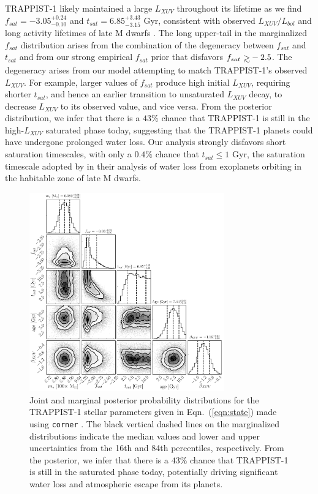 \documentclass[twocolumn]{aastex62}
\def\gsim{~\rlap{$>$}{\lower 1.0ex\hbox{$\sim$}}}
\begin{document}
TRAPPIST-1 likely maintained a large $L_{XUV}$ throughout its lifetime as we find $f_{sat} = -3.05^{+0.24}_{-0.10}$ and $t_{sat} = 6.85^{+3.43}_{-3.15}$ Gyr, consistent with observed $L_{XUV}/L_{bol}$ and long activity lifetimes of late M dwarfs \citep{West2008,Wright2018}. The long upper-tail in the marginalized $f_{sat}$ distribution arises from the combination of the degeneracy between $f_{sat}$ and $t_{sat}$ and from our strong empirical $f_{sat}$ prior that disfavors $f_{sat} \gsim -2.5$. The degeneracy arises from our model attempting to match TRAPPIST-1's observed $L_{XUV}$. For example, larger values of $f_{sat}$ produce high initial $L_{XUV}$, requiring shorter $t_{sat}$, and hence an earlier transition to unsaturated $L_{XUV}$ decay, to decrease $L_{XUV}$ to its observed value, and vice versa. From the posterior distribution, we infer that there is a $43\%$ chance that TRAPPIST-1 is still in the high-$L_{XUV}$ saturated phase today, suggesting that the TRAPPIST-1 planets could have undergone prolonged water loss. Our analysis strongly disfavors short saturation timescales, with only a $0.4\%$ chance that $t_{sat} \leq 1$ Gyr, the saturation timescale adopted by \citet{Luger2015} in their analysis of water loss from exoplanets orbiting in the habitable zone of late M dwarfs.

\begin{figure}[t]
\centering
	\includegraphics[width=0.75\textwidth]{../Analysis/Corner/trappist1Corner.pdf}
   \caption{Joint and marginal posterior probability distributions for the TRAPPIST-1 stellar parameters given in Eqn.~(\ref{eqn:state}) made using \texttt{corner} \citep{ForemanMackey2016}. The black vertical dashed lines on the marginalized distributions indicate the median values and lower and upper uncertainties from the 16th and 84th percentiles, respectively. From the posterior, we infer that there is a $43\%$ chance that TRAPPIST-1 is still in the saturated phase today, potentially driving significant water loss and atmospheric escape from its planets.}%
    \label{fig:corner}%
\end{figure}
\end{document}
